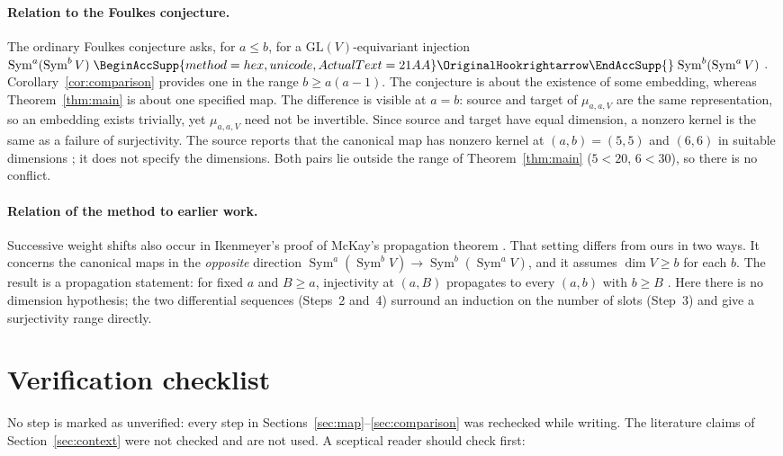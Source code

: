 \documentclass[11pt]{article}
\renewcommand{\hookrightarrow}{\mathrel{
  \BeginAccSupp{method=hex,unicode,ActualText=21AA}
  \OriginalHookrightarrow\EndAccSupp{}}}
\theoremstyle{remark}
\DeclareMathOperator{\Sym}{Sym}
\begin{document}
\paragraph{Relation to the Foulkes conjecture.}
The ordinary Foulkes conjecture \cite{Foulkes1950} asks, for $a\le b$, for
a $\mathrm{GL}(V)$-equivariant injection
$\Sym^a(\Sym^b V)\hookrightarrow\Sym^b(\Sym^a V)$
\cite[Conjecture~2.10]{RSW}. Corollary~\ref{cor:comparison} provides one in
the range $b\ge a(a-1)$. The conjecture is about the existence of some
embedding, whereas Theorem~\ref{thm:main} is about one specified map. The
difference is visible at $a=b$: source and target of $\mu_{a,a,V}$ are the
same representation, so an embedding exists trivially, yet $\mu_{a,a,V}$
need not be invertible. Since source and target have equal dimension, a
nonzero kernel is the same as a failure of surjectivity. The source reports
that the canonical map has nonzero kernel at $(a,b)=(5,5)$ and $(6,6)$ in
suitable dimensions
\cite[arXiv version, Theorem~6(b),(c) and Remark~7]{CIM}; it does not
specify the dimensions. Both pairs lie outside the range of
Theorem~\ref{thm:main} ($5<20$, $6<30$), so there is no conflict.

\paragraph{Relation of the method to earlier work.}
Successive weight shifts also occur in Ikenmeyer's proof
\cite[Section~5]{Ikenmeyer} of McKay's propagation theorem \cite{McKay}.
That setting differs from ours in two ways. It concerns the canonical maps
in the \emph{opposite} direction
$\Sym^a(\Sym^b V)\longrightarrow\Sym^b(\Sym^a V)$, and it assumes
$\dim V\ge b$ for each $b$. The result is a propagation statement: for
fixed $a$ and $B\ge a$, injectivity at $(a,B)$ propagates to every $(a,b)$
with $b\ge B$ \cite[Theorem~1.3 and Section~3]{Ikenmeyer}. Here there is no
dimension hypothesis; the two differential sequences (Steps~2 and~4)
surround an induction on the number of slots (Step~3) and give a
surjectivity range directly.

\section{Verification checklist}\label{sec:checklist}

No step is marked as unverified: every step in
Sections~\ref{sec:map}--\ref{sec:comparison} was rechecked while writing.
The literature claims of Section~\ref{sec:context} were not checked and are
not used. A sceptical reader should check first:
\end{document}
